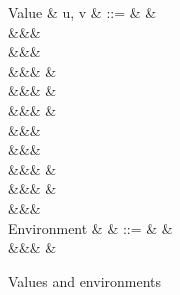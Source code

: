\begin{figure}
\begin{syntaxfig}
\mbox{Value}
&
u, v
&
::=
&
\exTrue \mid \exFalse
&
\\
&&&
\exTrueSel \mid \exFalseSel
\\
&&&
\\
&&&
&
\\
&&&
&
\\
&&&
&
\\
&&&
\\
&&&
\exNil
\\
&&&
\exNilSel
&
\\
&&&
&
\\
&&&
\\[2mm]
\mbox{Environment}
&
\rho
&
::=
&
\envEmpty
&
\\
&&&
&
\end{syntaxfig}
\caption{Values and environments}
\end{figure}
